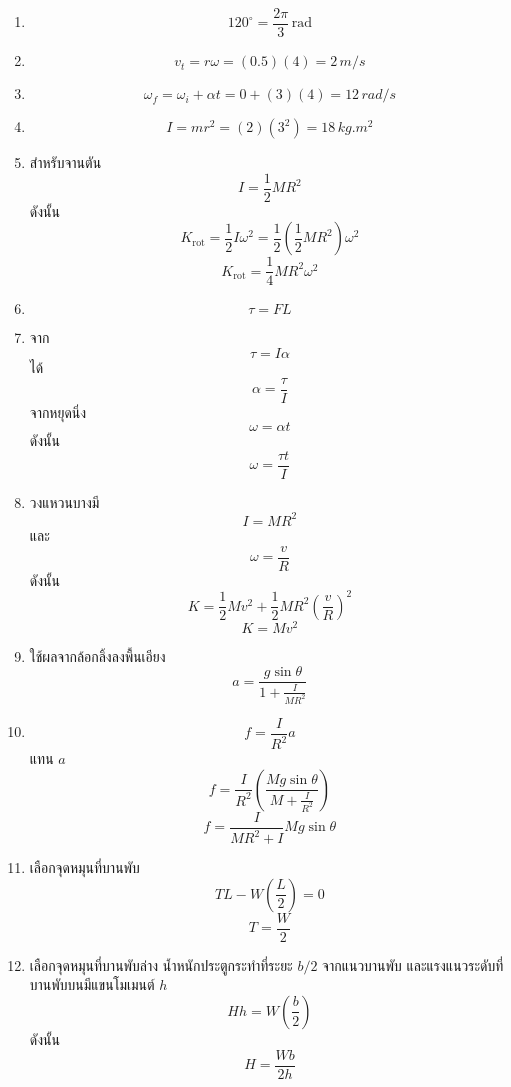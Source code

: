 \begin{enumerate}
    \item
    \[
    120^\circ=\frac{2\pi}{3}\,\text{rad}
    \]

    \item
    \[
    v_t=r\omega=(0.5)(4)=2\,\si{m/s}
    \]

    \item
    \[
    \omega_f=\omega_i+\alpha t=0+(3)(4)=12\,\si{rad/s}
    \]

    \item
    \[
    I=mr^2=(2)(3^2)=18\,\si{kg.m^2}
    \]

    \item
    สำหรับจานตัน
    \[
    I=\frac{1}{2}MR^2
    \]
    ดังนั้น
    \[
    K_{\text{rot}}=\frac{1}{2}I\omega^2
    =
    \frac{1}{2}\left(\frac{1}{2}MR^2\right)\omega^2
    \]
    \[
    K_{\text{rot}}=\frac{1}{4}MR^2\omega^2
    \]

    \item
    \[
    \tau=FL
    \]

    \item
    จาก
    \[
    \tau=I\alpha
    \]
    ได้
    \[
    \alpha=\frac{\tau}{I}
    \]
    จากหยุดนิ่ง
    \[
    \omega=\alpha t
    \]
    ดังนั้น
    \[
    \omega=\frac{\tau t}{I}
    \]

    \item
    วงแหวนบางมี
    \[
    I=MR^2
    \]
    และ
    \[
    \omega=\frac{v}{R}
    \]
    ดังนั้น
    \[
    K=\frac{1}{2}Mv^2+\frac{1}{2}MR^2\left(\frac{v}{R}\right)^2
    \]
    \[
    K=Mv^2
    \]

    \item
    ใช้ผลจากล้อกลิ้งลงพื้นเอียง
    \[
    a=\frac{g\sin\theta}{1+\frac{I}{MR^2}}
    \]

    \item
    \[
    f=\frac{I}{R^2}a
    \]
    แทน $a$
    \[
    f=
    \frac{I}{R^2}
    \left(
    \frac{Mg\sin\theta}{M+\frac{I}{R^2}}
    \right)
    \]
    \[
    f=\frac{I}{MR^2+I}Mg\sin\theta
    \]

    \item
    เลือกจุดหมุนที่บานพับ
    \[
    TL-W\left(\frac{L}{2}\right)=0
    \]
    \[
    T=\frac{W}{2}
    \]

    \item
    เลือกจุดหมุนที่บานพับล่าง
    น้ำหนักประตูกระทำที่ระยะ $b/2$ จากแนวบานพับ และแรงแนวระดับที่บานพับบนมีแขนโมเมนต์ $h$
    \[
    Hh=W\left(\frac{b}{2}\right)
    \]
    ดังนั้น
    \[
    H=\frac{Wb}{2h}
    \]
\end{enumerate}

